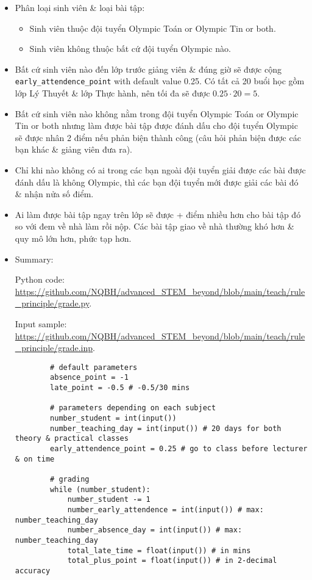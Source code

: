 \documentclass{article}
\begin{document}
\begin{itemize}
	\item Phân loại sinh viên \& loại bài tập:
	\begin{itemize}
		\item Sinh viên thuộc đội tuyển Olympic Toán or Olympic Tin or both.
		\item Sinh viên không thuộc bất cứ đội tuyển Olympic nào.
	\end{itemize}
	\item Bất cứ sinh viên nào đến lớp trước giảng viên \& đúng giờ sẽ được cộng \verb|early_attendence_point| with default value 0.25. Có tất cả 20 buổi học gồm lớp Lý Thuyết \& lớp Thực hành, nên tối đa sẽ được $0.25\cdot20 = 5$.
	\item Bất cứ sinh viên nào không nằm trong đội tuyển Olympic Toán or Olympic Tin or both nhưng làm được bài tập được đánh dấu cho đội tuyển Olympic sẽ được nhân 2 điểm nếu phản biện thành công (câu hỏi phản biện được các bạn khác \& giảng viên đưa ra).
	\item Chỉ khi nào không có ai trong các bạn ngoài đội tuyển giải được các bài được đánh dấu là không Olympic, thì các bạn đội tuyển mới được giải các bài đó \& nhận nửa số điểm.
	\item Ai làm được bài tập ngay trên lớp sẽ được + điểm nhiều hơn cho bài tập đó so với đem về nhà làm rồi nộp. Các bài tập giao về nhà thường khó hơn \& quy mô lớn hơn, phức tạp hơn.
	\item Summary:
	
	Python code: \url{https://github.com/NQBH/advanced_STEM_beyond/blob/main/teach/rule_principle/grade.py}.
	
	Input sample: \url{https://github.com/NQBH/advanced_STEM_beyond/blob/main/teach/rule_principle/grade.inp}.
	\begin{verbatim}
		# default parameters
		absence_point = -1
		late_point = -0.5 # -0.5/30 mins
		
		# parameters depending on each subject
		number_student = int(input())
		number_teaching_day = int(input()) # 20 days for both theory & practical classes
		early_attendence_point = 0.25 # go to class before lecturer & on time
		
		# grading
		while (number_student):
		    number_student -= 1
		    number_early_attendence = int(input()) # max: number_teaching_day
		    number_absence_day = int(input()) # max: number_teaching_day
		    total_late_time = float(input()) # in mins
		    total_plus_point = float(input()) # in 2-decimal accuracy
		    

\end{verbatim}
\end{itemize}
\end{document}
